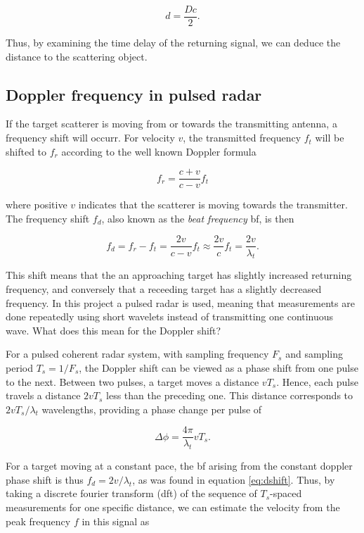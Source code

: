 \begin{equation}
	d = \frac{Dc}{2}.
\end{equation}

Thus, by examining the time delay of the returning signal, we can deduce the distance to the scattering object. 

\subsection{Doppler frequency in pulsed radar}
\label{doppler}

If the target scatterer is moving from or towards the transmitting antenna, a frequency shift will occurr. For velocity $v$, the transmitted frequency $f_t$ will be shifted to $f_r$ according to the well known Doppler formula \citep{ridenour_1947}

\begin{equation}
	f_r = \frac{c + v}{c - v}f_t
\end{equation}

where positive $v$ indicates that the scatterer is moving towards the transmitter. The frequency shift $f_d$, also known as the \emph{beat frequency} \gls{bf}, is then

\begin{equation}\label{eq:dshift}
	f_d 
	= f_r - f_t 
	= \frac{2v}{c-v}f_t \approx \frac{2v}{c}f_t 
	= \frac{2v}{\lambda_t}.
\end{equation}

This shift means that the an approaching target has slightly increased returning frequency, and conversely that a receeding target has a slightly decreased frequency. In this project a pulsed radar is used, meaning that measurements are done repeatedly using short wavelets instead of transmitting one continuous wave. What does this mean for the Doppler shift?

For a pulsed coherent radar system, with sampling frequency $F_s$ and sampling period $T_s = 1/F_s$, the Doppler shift can be viewed as a phase shift from one pulse to the next. Between two pulses, a target moves a distance $vT_s$. Hence, each pulse travels a distance $2vT_s$ less than the preceding one. This distance corresponds to $2vT_s/\lambda_t$ wavelengths, providing a phase change per pulse of

\begin{equation}
	\Delta \phi = \frac{4\pi}{\lambda_t}vT_s.
\end{equation}

For a target moving at a constant pace, the \gls{bf} arising from the constant doppler phase shift is thus $f_d = 2v/\lambda_t$, as was found in equation \ref{eq:dshift}. Thus, by taking a discrete fourier transform (\gls{dft}) of the sequence of $T_s$-spaced measurements for one specific distance, we can estimate the velocity from the peak frequency $f$ in this signal as 

